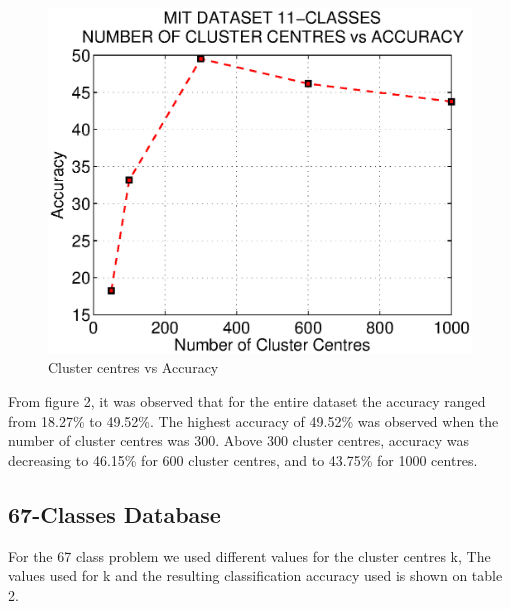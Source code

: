 \documentclass[10pt,twocolumn,letterpaper]{article}
\begin{document}
\begin{figure}[h]
      \centering
      \includegraphics[width=0.8\linewidth]{img/11c.eps}
      \caption{Cluster centres vs Accuracy}
\end{figure}

From figure 2, it was observed that for the entire dataset the accuracy ranged from 18.27\% to 49.52\%. The highest accuracy of 49.52\% was observed when the number of cluster centres was 300. Above 300 cluster centres, accuracy was decreasing to 46.15\% for 600 cluster centres, and to 43.75\% for 1000 centres.


\subsection{67-Classes Database}
For the 67 class problem we used different values for the cluster centres k, The values used for k and the resulting classification accuracy used is shown on table 2.
\end{document}
